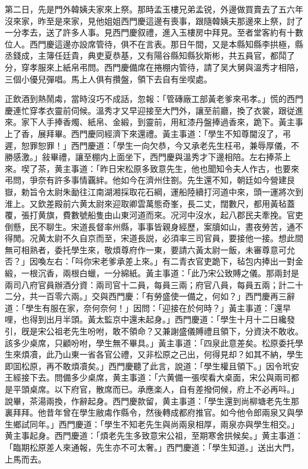 第二日，先是門外韓姨夫家來上祭。那時孟玉樓兄弟孟锐，外邊做買賣去了五六年沒來家，昨至是來家，見他姐姐西門慶這邊有喪事，跟隨韓姨夫那邊來上祭，討了一分孝去，送了許多人事。見西門慶叙禮，進入玉樓房中拜見。至者堂客約有十數位人。西門慶這邊亦設席管待，俱不在言表。那日午間，又是本縣知縣李拱極，縣丞錢成，主簿任廷貴，典吏夏恭基，又有陽谷縣知縣狄斯彬，共五員官，都鬦了分，穿孝服來上紙帛弔問。西門慶備席在捲棚内管待，請了吴大舅與溫秀才相陪，三個小優兒彈唱。馬上人俱有攢盤，領下去自有坐喫處。

正飲酒到熱鬧䖏，當時沒巧不成話，忽報：「管磚廠工部黃老爹來弔孝。」慌的西門慶連忙穿孝衣靈前伺候。溫秀才又早迎接至大門外，讓至前廳，換了衣裳，跟従進來。家下人手捧香燭、紙帛、金緞，到靈前，用紅漆丹盤捧過香來，跪下。黃主事上了香，展拜畢。西門慶同經濟下來還禮。黃主事道：「學生不知尊閫沒了，弔遲，恕罪恕罪！」西門慶道：「學生一向欠恭，今又承老先生枉弔，兼辱厚儀，不勝感激。」敍畢禮，讓至棚内上面坐下，西門慶與溫秀才下邊相陪。左右捧茶上來。喫了茶，黄主事道：「昨日宋松原多致意先生，他也聞知令夫人作古，也要來弔問，爭奈有許多事情覊絆。他如今在濟州住劄。先生還不知，朝廷如今營建艮嶽，勅旨令太尉朱勔往江南湖湘採取花石綱，運船陸續打河道中來，頭一運將次到淮上。又欽差殿前六黄太尉來迎取卿雲萬態奇峯，長二丈，闊數尺，都用黃毡蓋覆，張打黄旗，費數號船隻由山東河道而來。况河中沒水，起八郡民夫牽挽。官吏倒懸，民不聊生。宋道長督率州縣，事事皆親身經歷，案牘如山，晝夜勞苦，通不得閒。况黄太尉不久自京而至，宋道長説，必須率三司官員，要接他一接。想此間無可相熟者，委托學生來，敬煩尊府作一東，要請六黃太尉一飯，未審尊意可允否？」因喚左右：「呌你宋老爹承差上來。」有二青衣官吏跪下，毡包内捧出一對金緞，一根沉香，兩根白蠟，一分綿紙。黃主事道：「此乃宋公致賻之儀。那兩封是兩司八府官員辦酒分資：兩司官十二員，每員三兩；府官八員，每員五兩；計二十二分，共一百零六兩。」交與西門慶：「有勞盛使一備之，何如？」西門慶再三辭道：「學生有服在家，奈何奈何！」因問：「迎接在於何時？」黃主事道：「還早哩，也得到出月半頭。黃太監京中還未起身。」西門慶道：「學生十月十二日纔發引，旣是宋公祖老先生吩咐，敢不領命？又兼謝盛儀賻禮且領下，分資決不敢收。該多少桌席，只顧吩咐，學生無不畢具。」黃主事道：「四泉此意差矣。松原委托學生來煩凟，此乃山東一省各官公禮，又非松原之己出，何得見却？如其不納，學生即囬松原，再不敢煩凟矣。」西門慶聽了此言，說道：「學生權且領下。」因令玳安王經接下去。問備多少桌席，黄主事道：「六黄備一張喫看大桌面，宋公與兩司都是平頭桌席。以下府官，散席而已。承應楽人，自有差撥伺候，府上不必再呌。」說畢，茶湯兩換，作辭起身。西門慶款留，黄主事道：「學生還到尚柳塘老先生那裏拜拜。他昔年曾在學生敝䖏作縣令，然後轉成都府推官。如今他令郎兩泉又與學生鄉試同年。」西門慶道：「學生不知老先生與尚兩泉相厚，兩泉亦與學生相交。」黄主事起身。西門慶道：「煩老先生多致意宋公祖，至期寒舍拱候矣。」黄主事道：「臨期松原差人來通報，先生亦不可太奢。」西門慶道：「學生知道。」送出大門，上馬而去。

